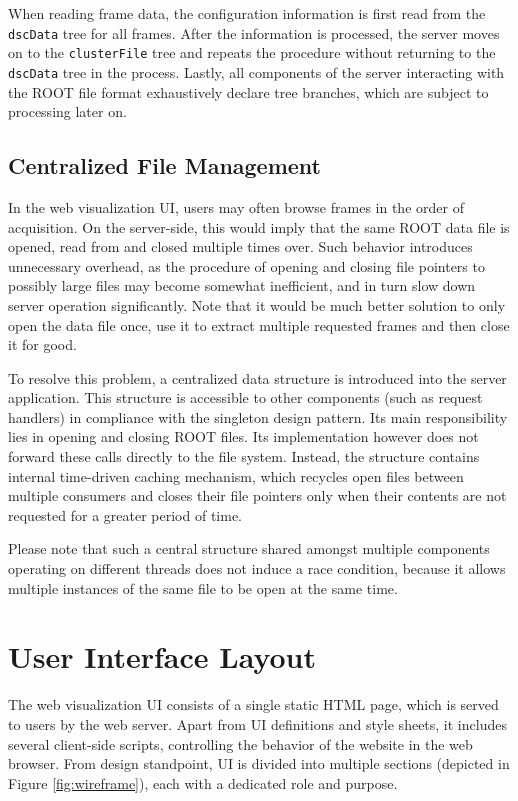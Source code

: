 When reading frame data, the configuration information is first read from the \texttt{dscData} tree for all frames. After the information is processed, the server moves on to the \texttt{clusterFile} tree and repeats the procedure without returning to the \texttt{dscData} tree in the process. Lastly, all components of the server interacting with the ROOT file format exhaustively declare tree branches, which are subject to processing later on.

\subsection{Centralized File Management}
In the web visualization UI, users may often browse frames in the order of acquisition. On the server-side, this would imply that the same ROOT data file is opened, read from and closed multiple times over. Such behavior introduces unnecessary overhead, as the procedure of opening and closing file pointers to possibly large files may become somewhat inefficient, and in turn slow down server operation significantly. Note that it would be much better solution to only open the data file once, use it to extract multiple requested frames and then close it for good.

To resolve this problem, a centralized data structure is introduced into the server application. This structure is accessible to other components (such as request handlers) in compliance with the singleton design pattern. Its main responsibility lies in opening and closing ROOT files. Its implementation however does not forward these calls directly to the file system. Instead, the structure contains internal time-driven caching mechanism, which recycles open files between multiple consumers and closes their file pointers only when their contents are not requested for a greater period of time.

Please note that such a central structure shared amongst multiple components operating on different threads does not induce a race condition, because it allows multiple instances of the same file to be open at the same time.

\section{User Interface Layout}
The web visualization UI consists of a single static HTML page, which is served to users by the web server. Apart from UI definitions and style sheets, it includes several client-side scripts, controlling the behavior of the website in the web browser. From design standpoint, UI is divided into multiple sections (depicted in Figure \ref{fig:wireframe}), each with a dedicated role and purpose.

